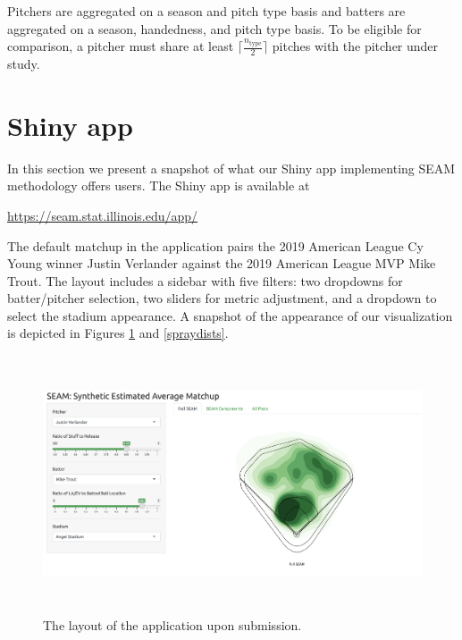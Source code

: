 \documentclass[12pt]{article}
\begin{document}
Pitchers are aggregated on a season and pitch type basis and batters are aggregated on a season, handedness, and pitch type basis. To be eligible for comparison, a pitcher must share at least  $\lceil \frac{n_{\text{type}}}{2} \rceil$ pitches with the pitcher under study.





\section{Shiny app}

In this section we present a snapshot of what our Shiny app implementing SEAM methodology offers users. The Shiny app is available at 
\begin{center}
\url{https://seam.stat.illinois.edu/app/} 
\end{center}
The default matchup in the application pairs the 2019 American League Cy Young winner Justin Verlander against the 2019 American League MVP Mike Trout. The layout includes a sidebar with five filters: two dropdowns for batter/pitcher selection, two sliders for metric adjustment, and a dropdown to select the stadium appearance. A snapshot of the appearance of our visualization is depicted in Figures \ref{layout} and \ref{spraydists}.


\begin{figure}
\centering
    \includegraphics[width=5.5in, height=3in]{nFig1_layout.png}
    \caption{The layout of the application upon submission.}
    \label{layout}
\end{figure}
\end{document}
